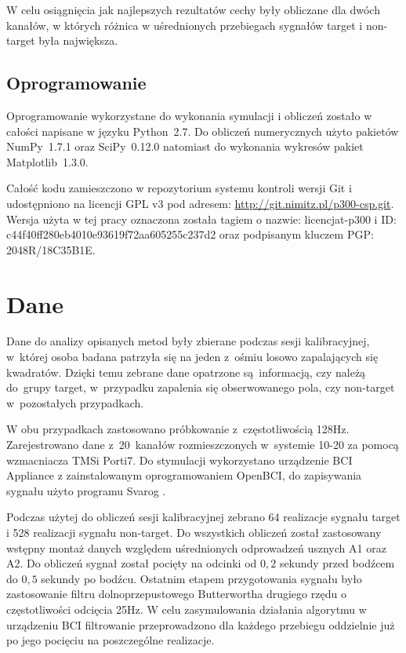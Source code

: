 \documentclass[licencjacka,openright]{pracamgr}
\begin{document}
W celu osiągnięcia jak najlepszych rezultatów cechy były obliczane dla dwóch kanałów, w których różnica w uśrednionych przebiegach sygnałów target i non-target była największa.

\section{Oprogramowanie}
Oprogramowanie wykorzystane do wykonania symulacji i obliczeń zostało w całości napisane w języku Python~2{.}7. Do obliczeń numerycznych użyto pakietów NumPy~1{.}7{.}1 oraz SciPy~0{.}12{.}0 natomiast do wykonania wykresów pakiet Matplotlib~1{.}3{.}0.

Całość kodu zamieszczono w repozytorium systemu kontroli wersji Git i udostępniono na licencji GPL v3 pod adresem: \url{http://git.nimitz.pl/p300-csp.git}. Wersja użyta w tej pracy oznaczona została tagiem o nazwie: licencjat-p300 i ID: c44f40ff280eb4010e93619f72aa605255c237d2 oraz podpisanym kluczem PGP: 2048R/18C35B1E.

\chapter{Dane}
Dane do analizy opisanych metod były zbierane podczas sesji kalibracyjnej, w~której osoba badana patrzyła się na jeden z~ośmiu losowo zapalających się kwadratów. Dzięki temu zebrane dane opatrzone są~informacją, czy należą do~grupy target, w~przypadku zapalenia się obserwowanego pola, czy non-target w~pozostałych przypadkach.

W obu przypadkach zastosowano próbkowanie z~częstotliwością 128Hz. Zarejestrowano dane z~20~kanałów rozmieszczonych w~systemie 10-20 za pomocą wzmacniacza TMSi Porti7. Do stymulacji wykorzystano urządzenie BCI Appliance z zainstalowanym oprogramowaniem OpenBCI, do zapisywania sygnału użyto programu Svarog \citep{obci}.

Podczas użytej do obliczeń sesji kalibracyjnej zebrano 64 realizacje sygnału target i 528 realizacji sygnału non-target. Do wszystkich obliczeń został zastosowany wstępny montaż danych względem uśrednionych odprowadzeń usznych A1 oraz A2. Do obliczeń sygnał został pocięty na odcinki od $0{,}2$ sekundy przed bodźcem do $0{,}5$ sekundy po bodźcu. Ostatnim etapem przygotowania sygnału było zastosowanie filtru dolnoprzepustowego Butterwortha drugiego rzędu o częstotliwości odcięcia 25Hz. W celu zasymulowania działania algorytmu w urządzeniu BCI filtrowanie przeprowadzono dla każdego przebiegu oddzielnie już po jego pocięciu na poszczególne realizacje.
\end{document}
